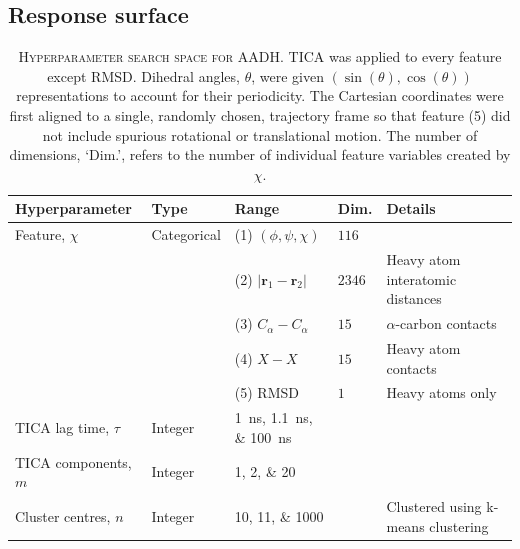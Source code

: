 \subsection{Response surface}\label{sec:aadh_rsm}

\begin{table}[ht]
    \centering
    \begin{tabularx}{0.9\textwidth}{ >{\raggedright\arraybackslash}ll>{\raggedright\arraybackslash}Xl >{\raggedright\arraybackslash}X } 
    \toprule
    Hyperparameter & Type & Range & Dim. & Details \\
     \midrule
    Feature, $\chi$ & Categorical & (1) $(\phi, \psi, \chi)$ & $\num{116}$  & \\
    & & (2) $|\mathbf{r}_{1}-\mathbf{r}_{2}|$  & $\num{ 2346}$& Heavy atom interatomic distances \\
    & & (3) $C_{\alpha}-C_{\alpha}$ & $\num{15}$ & $\alpha$-carbon contacts\\ 
    & & (4) $X-X$  & $\num{15}$ & Heavy atom contacts\\ 
    & & (5) RMSD & $\num{1}$ &  Heavy atoms only\\ 
    \midrule
    TICA lag time, $\tau$ & Integer &\SIlist[list-final-separator = { ... }]{1;1.1;100}{ns} &  & \\
    \midrule
    TICA components, $m$& Integer &\numlist[list-final-separator = { ... }]{1;2;20} & & \\
    \midrule
    Cluster centres, $n$ & Integer & \numlist[list-final-separator = { ... }]{10;11;1000}& &  Clustered using k-means clustering  \\
    \bottomrule
    \end{tabularx}
    \caption[Hyperparameter search space for AADH]{\textsc{Hyperparameter search space for AADH}. TICA was applied to every feature except RMSD. Dihedral angles, $\theta$, were given $\left(\sin(\theta),\cos(\theta)\right)$ representations to account for their periodicity.  The Cartesian coordinates were first aligned to a single, randomly chosen, trajectory frame so that feature (5) did not include spurious rotational or translational motion. The number of dimensions, `Dim.', refers to the number of individual feature variables created by $\chi$.}
    \label{tab:aadh_searchspace}
\end{table}

